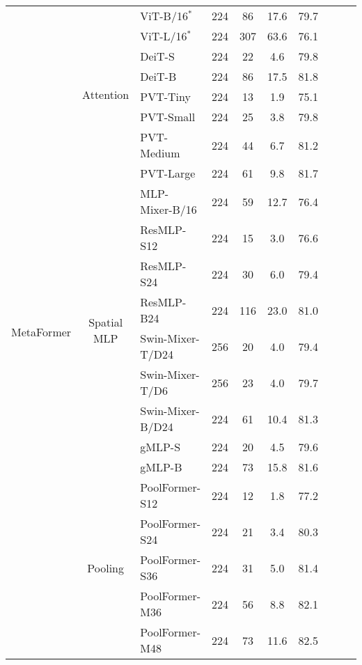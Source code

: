 \begin{tabular}{c|clccccccc}
   \multirow{22}{*}{MetaFormer}  & \multirow{8}{*}{Attention} & \vitdot{} ViT-B/16$^*$ \cite{vit} & 224 &  86 & 17.6 & 79.7 \\
             &          & \vitdot{} ViT-L/16$^*$ \cite{vit} & 224 & 307 & 63.6 & 76.1 \\
             &          & \deitdot{} DeiT-S \cite{deit} & 224 & 22 & 4.6 & 79.8 \\
             &          & \deitdot{} DeiT-B \cite{deit} & 224 &  86 & 17.5 & 81.8 \\
             &          & \pvtdot{} PVT-Tiny \cite{pvt} & 224 & 13 & 1.9 & 75.1 \\
             &          & \pvtdot{} PVT-Small \cite{pvt} & 224 & 25 & 3.8 & 79.8 \\
             &          & \pvtdot{} PVT-Medium \cite{pvt} & 224 & 44 &  6.7 & 81.2 \\
             &          & \pvtdot{} PVT-Large \cite{pvt} & 224 & 61 &  9.8 & 81.7 \\
    \cline{2-7}
             & \multirow{9}{*}{Spatial MLP} & \mlpmixerdot{} MLP-Mixer-B/16 \cite{mlp-mixer} & 224 & 59 & 12.7 & 76.4 \\
             &             & \resmlp{} ResMLP-S12 \cite{resmlp} & 224 & 15 & 3.0 & 76.6 \\
             &             & \resmlp{} ResMLP-S24 \cite{resmlp} & 224 & 30 & 6.0 & 79.4 \\
             &             & \resmlp{} ResMLP-B24 \cite{resmlp} & 224 & 116 & 23.0 & 81.0 \\
             &             & \swinmixer{} Swin-Mixer-T/D24 \cite{swin} & 256 & 20 & 4.0 & 79.4 \\
             &             & \swinmixer{} Swin-Mixer-T/D6 \cite{swin} & 256 & 23 & 4.0 & 79.7 \\
             &             & \swinmixer{} Swin-Mixer-B/D24 \cite{swin} & 224 & 61 & 10.4 & 81.3 \\
             &             & \gmlp{} gMLP-S \cite{gmlp} & 224 & 20 & 4.5 & 79.6 \\
             &             & \gmlp{} gMLP-B \cite{gmlp} & 224 & 73 & 15.8 & 81.6 \\
    \cline{2-7}
             & \multirow{5}{*}{Pooling}  & \poolformer{} PoolFormer-S12 & 224 & 12 & 1.8 & 77.2 \\ %
             &         & \poolformer{} PoolFormer-S24 & 224 & 21 & 3.4 & 80.3 \\
             &         & \poolformer{} PoolFormer-S36 & 224 & 31 & 5.0 & 81.4 \\ %
             &         & \poolformer{} PoolFormer-M36 & 224 & 56 & 8.8 & 82.1 \\
             &         & \poolformer{} PoolFormer-M48 & 224 & 73 & 11.6 & 82.5 \\
    \bottomrule
             
    \end{tabular}